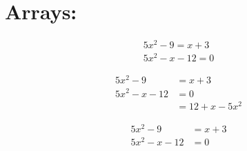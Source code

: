 \documentclass[11pt]{article}
\begin{document}
\section{Arrays:}

\begin{align}
5x^2-9=x+3\\
5x^2-x-12=0
\end{align}

\begin{align*}
5x^2-9&=x+3\\
5x^2-x-12&=0\\
&=12+x-5x^2
\end{align*}

\begin{align}
5x^2-9&=x+3\\
5x^2-x-12&=0
\end{align}
\end{document}
